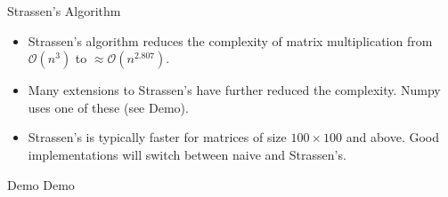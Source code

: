 \documentclass[serif,xcolor=pdftex,dvipsnames,table,hyperref={bookmarks=false,breaklinks}]{beamer}
\begin{document}
\begin{frame}[t]{Strassen's Algorithm}
	\begin{itemize}[<+->]
		\item Strassen's algorithm reduces the complexity of matrix multiplication from $\mathcal{O}(n^3)$ to $\approx \mathcal{O}(n^2.807)$.
		\item Many extensions to Strassen's have further reduced the complexity. Numpy uses one of these (see Demo).
		\item Strassen's is typically faster for matrices of size $100 \times 100$ and above. Good implementations will switch between naive and Strassen's.
	\end{itemize}
\end{frame}

\begin{frame}[t]{Demo}
	\centering
	\Huge{Demo}
\end{frame}
\end{document}
